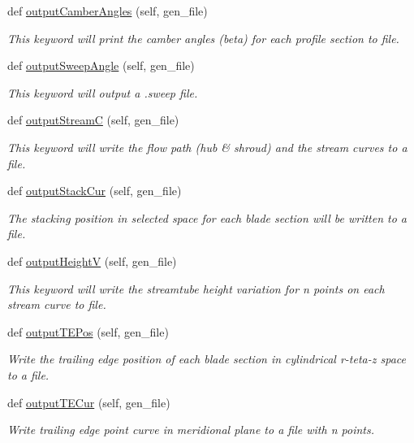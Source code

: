 \begin{DoxyCompactItemize}
def \hyperlink{a00070_ab5d0d97e4bf1dd0ddf28f4f537fea598}{output\+Camber\+Angles} (self, gen\+\_\+file)
\begin{DoxyCompactList}\small\item\em This keyword will print the camber angles (beta) for each profile section to file. \end{DoxyCompactList}\item 
def \hyperlink{a00070_a9d8a631853a80acf18ab0d1c05a11dec}{output\+Sweep\+Angle} (self, gen\+\_\+file)
\begin{DoxyCompactList}\small\item\em This keyword will output a .sweep file. \end{DoxyCompactList}\item 
def \hyperlink{a00070_a6dc19a2bae75b4c52b4337a55574363d}{output\+StreamC} (self, gen\+\_\+file)
\begin{DoxyCompactList}\small\item\em This keyword will write the flow path (hub \& shroud) and the stream curves to a file. \end{DoxyCompactList}\item 
def \hyperlink{a00070_a38ac1495c5c1cc730241601a8300d632}{output\+Stack\+Cur} (self, gen\+\_\+file)
\begin{DoxyCompactList}\small\item\em The stacking position in selected space for each blade section will be written to a file. \end{DoxyCompactList}\item 
def \hyperlink{a00070_a15fdf4aaecf99b885796124500f80114}{output\+HeightV} (self, gen\+\_\+file)
\begin{DoxyCompactList}\small\item\em This keyword will write the streamtube height variation for n points on each stream curve to file. \end{DoxyCompactList}\item 
def \hyperlink{a00070_af96b8ec5130403c737d4105e04edea5d}{output\+T\+E\+Pos} (self, gen\+\_\+file)
\begin{DoxyCompactList}\small\item\em Write the trailing edge position of each blade section in cylindrical r-\/teta-\/z space to a file. \end{DoxyCompactList}\item 
def \hyperlink{a00070_a93fdb47e6f9162ce3fe7ef624f7681aa}{output\+T\+E\+Cur} (self, gen\+\_\+file)
\begin{DoxyCompactList}\small\item\em Write trailing edge point curve in meridional plane to a file with n points. \end{DoxyCompactList}\item 

\end{DoxyCompactItemize}
